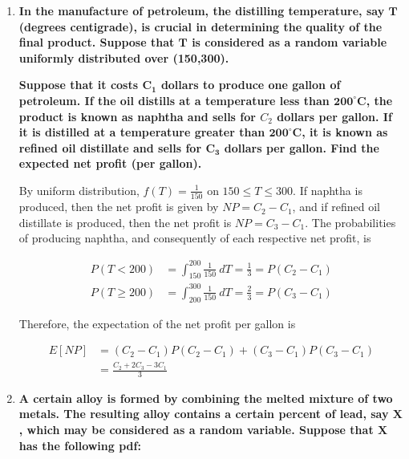 \documentclass[10pt, oneside]{article}
\begin{document}
\begin{enumerate}[label=7.\arabic*]
\[ E[D] = \sum^5_{d=1} d P(D = d) = 1(0.1) + 2(0.1) + 3(0.3) + 4(0.3) + 5(0.2) = \boxed{3.4} \]

\item  \begin{tcolorbox}[
  colback=Cerulean!5!white,
  colframe=Cerulean!75!black]
\textbf{In the manufacture of petroleum, the distilling temperature, say $\bm{T}$ (degrees centigrade), is crucial in determining the quality of the final product. Suppose that $\bm{T}$ is considered as a random variable uniformly distributed over (150,300).}

\textbf{Suppose that it costs $\bm{C_1}$ dollars to produce one gallon of petroleum. If the oil distills at a temperature less than $\bm{200^\circ}$C, the product is known as naphtha and sells for $C_2$ dollars per gallon. If it is distilled at a temperature greater than $\bm{200^\circ}$C, it is known as refined oil distillate and sells for $\bm{C_3}$ dollars per gallon. Find the expected net profit (per gallon).}
\end{tcolorbox}

By uniform distribution, $f(T) = \frac{1}{150}$ on $150 \leq T \leq 300$. If naphtha is produced, then the net profit is given by $NP = C_2 - C_1$, and if refined oil distillate is produced, then the net profit is $NP = C_3 - C_1$. The probabilities of producing naphtha, and consequently of each respective net profit, is

\begin{align*}
P(T < 200) &= \int^{200}_{150} \frac{1}{150} \ dT = \frac{1}{3} = P(C_2 - C_1) \\
P(T \geq 200) &= \int^{300}_{200} \frac{1}{150} \ dT = \frac{2}{3} = P(C_3 - C_1) 
\end{align*}

Therefore, the expectation of the net profit per gallon is

\begin{align*}
E[NP] &= (C_2 - C_1) P(C_2 - C_1) + (C_3 - C_1) P(C_3 - C_1) \\
&= \boxed{\frac{C_2 + 2 C_3 - 3 C_1}{3}}
\end{align*}

\item  \begin{tcolorbox}[
  colback=Cerulean!5!white,
  colframe=Cerulean!75!black]
\textbf{A certain alloy is formed by combining the melted mixture of two metals. The resulting alloy contains a certain percent of lead, say $\bm{X}$, which may be considered as a random variable. Suppose that $\bm{X}$ has the following pdf:}


\end{tcolorbox}
\end{enumerate}
\end{document}
